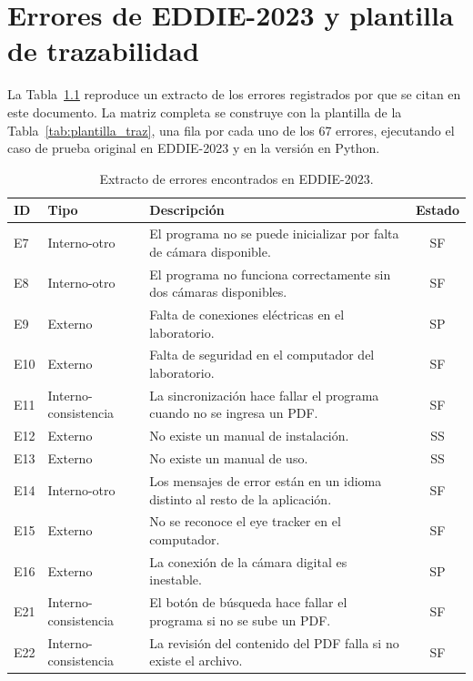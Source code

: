 
\chapter{Errores de EDDIE-2023 y plantilla de trazabilidad}
\label{an:errores}

La Tabla~\ref{tab:extracto_errores} reproduce un extracto de los errores registrados por \citet{ibaceta2023evaluacion} que se citan en este documento. La matriz completa se construye con la plantilla de la Tabla~\ref{tab:plantilla_traz}, una fila por cada uno de los 67 errores, ejecutando el caso de prueba original en EDDIE-2023 y en la versión en Python.

\begin{table}[H]
\centering
\caption{Extracto de errores encontrados en EDDIE-2023.}
\label{tab:extracto_errores}
\footnotesize
\begin{tabularx}{\textwidth}{l l X c}
\toprule
ID & Tipo & Descripción & Estado \\ \midrule
E7 & Interno-otro & El programa no se puede inicializar por falta de cámara disponible. & SF \\
E8 & Interno-otro & El programa no funciona correctamente sin dos cámaras disponibles. & SF \\
E9 & Externo & Falta de conexiones eléctricas en el laboratorio. & SP \\
E10 & Externo & Falta de seguridad en el computador del laboratorio. & SF \\
E11 & Interno-consistencia & La sincronización hace fallar el programa cuando no se ingresa un PDF. & SF \\
E12 & Externo & No existe un manual de instalación. & SS \\
E13 & Externo & No existe un manual de uso. & SS \\
E14 & Interno-otro & Los mensajes de error están en un idioma distinto al resto de la aplicación. & SF \\
E15 & Externo & No se reconoce el eye tracker en el computador. & SF \\
E16 & Externo & La conexión de la cámara digital es inestable. & SP \\
E21 & Interno-consistencia & El botón de búsqueda hace fallar el programa si no se sube un PDF. & SF \\
E22 & Interno-consistencia & La revisión del contenido del PDF falla si no existe el archivo. & SF \\

\end{tabularx}
\end{table}

